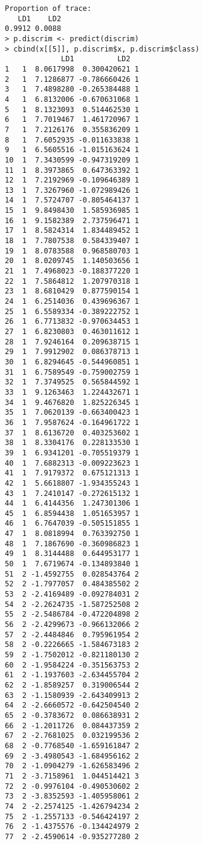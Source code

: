 \begin{enumerate}
\begin{lstlisting}
Proportion of trace:
   LD1    LD2 
0.9912 0.0088 
> p.discrim <- predict(discrim)
> cbind(x[[5]], p.discrim$x, p.discrim$class)
             LD1          LD2  
1   1  8.0617998  0.300420621 1
2   1  7.1286877 -0.786660426 1
3   1  7.4898280 -0.265384488 1
4   1  6.8132006 -0.670631068 1
5   1  8.1323093  0.514462530 1
6   1  7.7019467  1.461720967 1
7   1  7.2126176  0.355836209 1
8   1  7.6052935 -0.011633838 1
9   1  6.5605516 -1.015163624 1
10  1  7.3430599 -0.947319209 1
11  1  8.3973865  0.647363392 1
12  1  7.2192969 -0.109646389 1
13  1  7.3267960 -1.072989426 1
14  1  7.5724707 -0.805464137 1
15  1  9.8498430  1.585936985 1
16  1  9.1582389  2.737596471 1
17  1  8.5824314  1.834489452 1
18  1  7.7807538  0.584339407 1
19  1  8.0783588  0.968580703 1
20  1  8.0209745  1.140503656 1
21  1  7.4968023 -0.188377220 1
22  1  7.5864812  1.207970318 1
23  1  8.6810429  0.877590154 1
24  1  6.2514036  0.439696367 1
25  1  6.5589334 -0.389222752 1
26  1  6.7713832 -0.970634453 1
27  1  6.8230803  0.463011612 1
28  1  7.9246164  0.209638715 1
29  1  7.9912902  0.086378713 1
30  1  6.8294645 -0.544960851 1
31  1  6.7589549 -0.759002759 1
32  1  7.3749525  0.565844592 1
33  1  9.1263463  1.224432671 1
34  1  9.4676820  1.825226345 1
35  1  7.0620139 -0.663400423 1
36  1  7.9587624 -0.164961722 1
37  1  8.6136720  0.403253602 1
38  1  8.3304176  0.228133530 1
39  1  6.9341201 -0.705519379 1
40  1  7.6882313 -0.009223623 1
41  1  7.9179372  0.675121313 1
42  1  5.6618807 -1.934355243 1
43  1  7.2410147 -0.272615132 1
44  1  6.4144356  1.247301306 1
45  1  6.8594438  1.051653957 1
46  1  6.7647039 -0.505151855 1
47  1  8.0818994  0.763392750 1
48  1  7.1867690 -0.360986823 1
49  1  8.3144488  0.644953177 1
50  1  7.6719674 -0.134893840 1
51  2 -1.4592755  0.028543764 2
52  2 -1.7977057  0.484385502 2
53  2 -2.4169489 -0.092784031 2
54  2 -2.2624735 -1.587252508 2
55  2 -2.5486784 -0.472204898 2
56  2 -2.4299673 -0.966132066 2
57  2 -2.4484846  0.795961954 2
58  2 -0.2226665 -1.584673183 2
59  2 -1.7502012 -0.821180130 2
60  2 -1.9584224 -0.351563753 2
61  2 -1.1937603 -2.634455704 2
62  2 -1.8589257  0.319006544 2
63  2 -1.1580939 -2.643409913 2
64  2 -2.6660572 -0.642504540 2
65  2 -0.3783672  0.086638931 2
66  2 -1.2011726  0.084437359 2
67  2 -2.7681025  0.032199536 2
68  2 -0.7768540 -1.659161847 2
69  2 -3.4980543 -1.684956162 2
70  2 -1.0904279 -1.626583496 2
71  2 -3.7158961  1.044514421 3
72  2 -0.9976104 -0.490530602 2
73  2 -3.8352593 -1.405958061 2
74  2 -2.2574125 -1.426794234 2
75  2 -1.2557133 -0.546424197 2
76  2 -1.4375576 -0.134424979 2
77  2 -2.4590614 -0.935277280 2

\end{lstlisting}
\end{enumerate}
